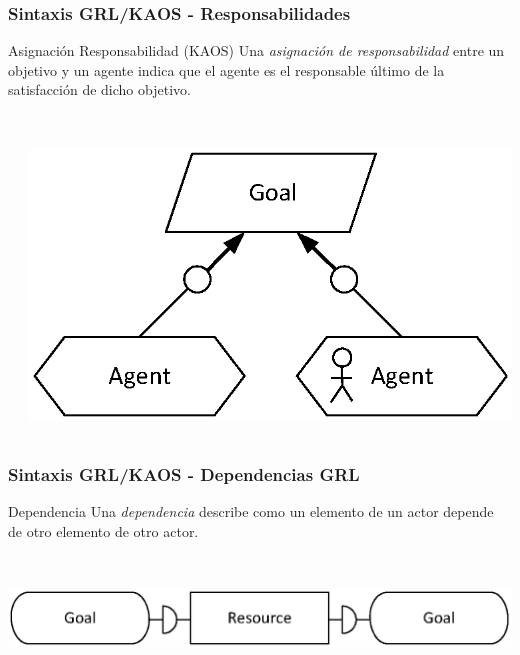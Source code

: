 \documentclass[handout,slidestop,xcolor=pst,dvips,blue]{beamer}
\begin{document}
\begin{frame}[c]
    \frametitle{Sintaxis GRL/KAOS - Responsabilidades}
    \begin{block}{Asignación Responsabilidad (KAOS)}
        Una \alert{\emph{asignación de responsabilidad}} entre un objetivo y un agente indica que el agente es el responsable último de la satisfacción de dicho objetivo.
        \ \\
        \ \\
        \begin{columns}[c]
            \begin{column}{0.50\linewidth}
            \end{column}
            \begin{column}{0.50\linewidth}
                \centering \includegraphics[width=0.65\columnwidth,keepaspectratio=true]{images/objetivos/responsabilityAsig(KAOS).eps}
            \end{column}
        \end{columns}
    \end{block}
\end{frame}

\begin{frame}[t]
    \frametitle{Sintaxis GRL/KAOS - Dependencias GRL}
    \begin{block}{Dependencia}
        Una \alert{\emph{dependencia}} describe como un elemento de un actor depende de otro  elemento de otro actor.
        \ \\
        \ \\
        \begin{columns}
            \begin{column}{\linewidth}
                \centering \includegraphics[width=0.75\columnwidth,keepaspectratio=true]{images/objetivos/dependency(GRL).eps}
            \end{column}
        \end{columns}
    \end{block}
\end{frame}
\end{document}
